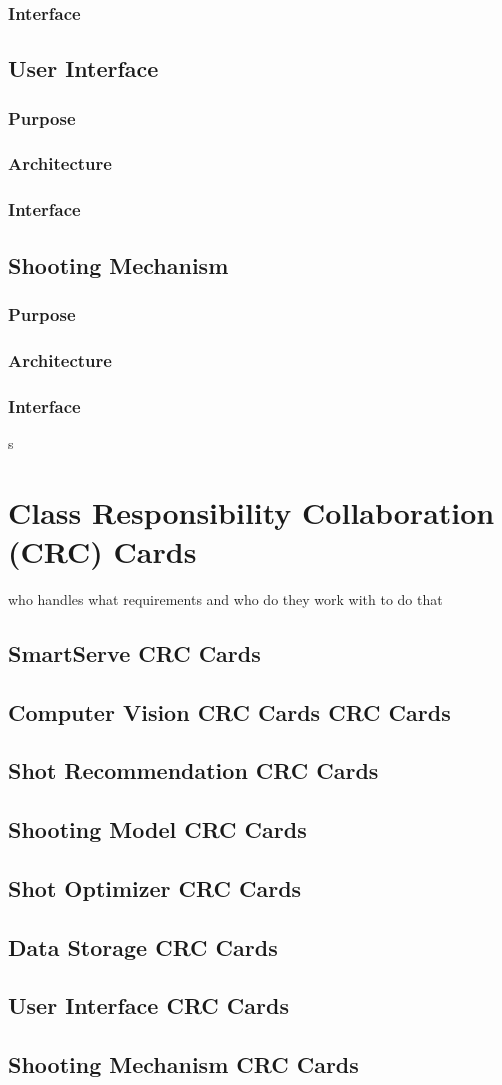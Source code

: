 \documentclass[11pt]{article}
\begin{document}
\subsubsection*{Interface}

\subsection{User Interface}
\subsubsection*{Purpose}
\subsubsection*{Architecture}
\subsubsection*{Interface}

\subsection{Shooting Mechanism}
\subsubsection*{Purpose}
\subsubsection*{Architecture}
\subsubsection*{Interface}
s
\section{Class Responsibility Collaboration (CRC) Cards}
who handles what requirements and who do they work with to do that
\subsection{SmartServe CRC Cards}
\subsection{Computer Vision CRC Cards CRC Cards}
\subsection{Shot Recommendation CRC Cards}
\subsection{Shooting Model CRC Cards}
\subsection{Shot Optimizer CRC Cards}
\subsection{Data Storage CRC Cards}
\subsection{User Interface CRC Cards}
\subsection{Shooting Mechanism CRC Cards}
\end{document}
